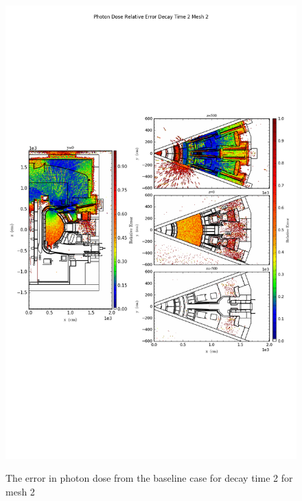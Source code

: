 \begin{figure}[ht!]
\centering
\includegraphics[trim={0cm 9cm 0cm 10cm},clip,scale=0.75]{../plots/final_model_nob4c/Photon_Dose_Relative_Error_Decay_Time_2_Mesh_2.png}
\label{fig:photons_dc2_no4bc_m2_error}
\caption{The error in photon dose from the baseline case for decay time 2 for mesh 2}
\end{figure}
